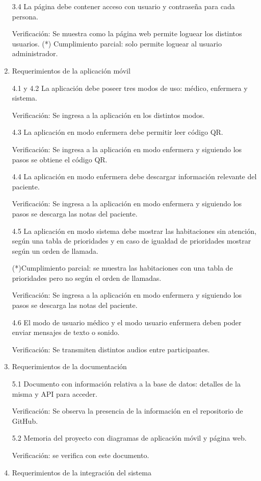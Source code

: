 \begin{enumerate}
3.4 La página debe contener acceso con usuario y contraseña para cada persona.


Verificación: Se muestra como la página web permite loguear los distintos usuarios.
(*) Cumplimiento parcial: solo permite loguear al usuario administrador.

\item Requerimientos de la aplicación móvil

4.1 y 4.2 La aplicación debe poseer tres modos de uso: médico, enfermera y sistema. 

Verificación: Se ingresa a la aplicación en los distintos modos.

4.3 La aplicación en modo enfermera debe permitir leer código QR.

Verificación: Se ingresa a la aplicación en modo enfermera y siguiendo los pasos se obtiene el código QR.

4.4 La aplicación en modo enfermera debe descargar información relevante del paciente.

Verificación: Se ingresa a la aplicación en modo enfermera y siguiendo los pasos se descarga las notas del paciente.

4.5 La aplicación en modo sistema debe mostrar las habitaciones sin atención, según una tabla de prioridades y en caso de igualdad de prioridades mostrar según un orden de llamada.

(*)Cumplimiento parcial: se muestra las habitaciones con una tabla de prioridades pero no según el orden de llamadas.

Verificación: Se ingresa a la aplicación en modo enfermera y siguiendo los pasos se descarga las notas del paciente.


4.6 El modo de usuario médico y el modo usuario enfermera deben poder enviar mensajes de texto o sonido.

Verificación: Se transmiten distintos audios entre participantes.

\item Requerimientos de la documentación

5.1 Documento con información relativa a la base de datos: detalles de la misma y API para acceder.

Verificación: Se observa la presencia de la información en el repositorio de GitHub.

5.2 Memoria del proyecto con diagramas de aplicación móvil y página web.

Verificación: se verifica con este documento.

\item Requerimientos de la integración del sistema


\end{enumerate}
